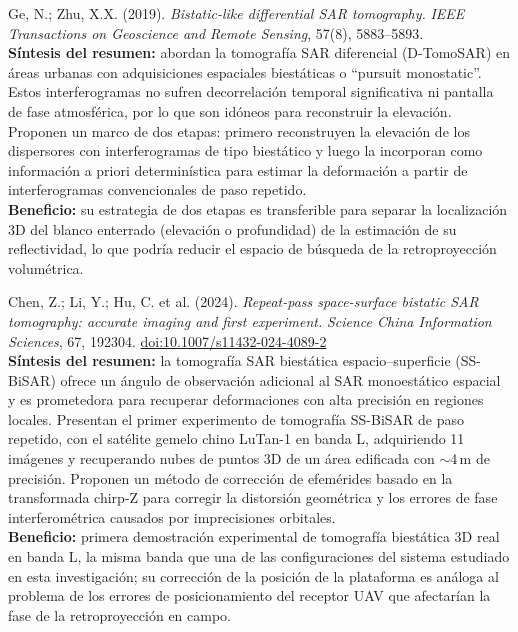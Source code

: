 \documentclass[11pt,a4paper]{report}
\begin{document}
\begin{enumerate}[label=\textbf{[C\arabic*]}, leftmargin=2.2cm, itemsep=10pt]

\item Ge, N.; Zhu, X.X. (2019). \textit{Bistatic-like differential SAR
tomography.} \emph{IEEE Transactions on Geoscience and Remote Sensing},
57(8), 5883--5893. \cite{ge2019}\\
\textbf{Síntesis del resumen:} abordan la tomografía SAR diferencial
(D-TomoSAR) en áreas urbanas con adquisiciones espaciales biestáticas o
``pursuit monostatic''. Estos interferogramas no sufren decorrelación
temporal significativa ni pantalla de fase atmosférica, por lo que son
idóneos para reconstruir la elevación. Proponen un marco de dos etapas:
primero reconstruyen la elevación de los dispersores con interferogramas de
tipo biestático y luego la incorporan como información a priori
determinística para estimar la deformación a partir de interferogramas
convencionales de paso repetido.\\
\textbf{Beneficio:} su estrategia de dos etapas es transferible para
separar la localización 3D del blanco enterrado (elevación o profundidad) de
la estimación de su reflectividad, lo que podría reducir el espacio de
búsqueda de la retroproyección volumétrica.

\item Chen, Z.; Li, Y.; Hu, C. et al. (2024). \textit{Repeat-pass
space-surface bistatic SAR tomography: accurate imaging and first
experiment.} \emph{Science China Information Sciences}, 67, 192304.
\href{https://doi.org/10.1007/s11432-024-4089-2}{doi:10.1007/s11432-024-4089-2}
\cite{chenz2024}\\
\textbf{Síntesis del resumen:} la tomografía SAR biestática
espacio--superficie (SS-BiSAR) ofrece un ángulo de observación adicional al
SAR monoestático espacial y es prometedora para recuperar deformaciones con
alta precisión en regiones locales. Presentan el primer experimento de
tomografía SS-BiSAR de paso repetido, con el satélite gemelo chino LuTan-1
en banda L, adquiriendo 11 imágenes y recuperando nubes de puntos 3D de un
área edificada con $\sim$4\,m de precisión. Proponen un método de
corrección de efemérides basado en la transformada chirp-Z para corregir la
distorsión geométrica y los errores de fase interferométrica causados por
imprecisiones orbitales.\\
\textbf{Beneficio:} primera demostración experimental de tomografía
biestática 3D real en banda L, la misma banda que una de las
configuraciones del sistema estudiado en esta investigación; su corrección
de la posición de la plataforma es análoga al problema de los errores de
posicionamiento del receptor UAV que afectarían la fase de la
retroproyección en campo.


\end{enumerate}
\end{document}
